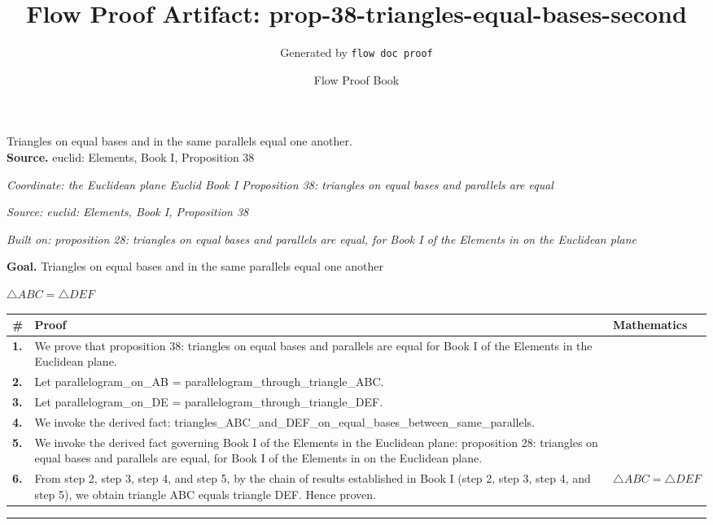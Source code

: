 \documentclass[11pt]{article}
\title{Flow Proof Artifact: prop-38-triangles-equal-bases-second}
\author{Generated by \texttt{flow doc proof}}
\date{Flow Proof Book}
\theoremstyle{definition}
\begin{document}
\maketitle
Triangles on equal bases and in the same parallels equal one another.\\[0.5em]
\textbf{Source.} euclid: Elements, Book I, Proposition 38\\[0.5em]
\bigskip
{}\par
\smallskip\noindent\textit{Coordinate: the Euclidean plane \cdot Euclid Book I \cdot Proposition 38: triangles on equal bases and parallels are equal}\par
\smallskip\noindent\textit{Source: euclid: Elements, Book I, Proposition 38}\par
\smallskip\noindent\textit{Built on: proposition 28: triangles on equal bases and parallels are equal, for Book I of the Elements in on the Euclidean plane}\par
\medskip
\noindent\textbf{Goal.} Triangles on equal bases and in the same parallels equal one another\par
\noindent$\displaystyle \triangle ABC = \triangle DEF$\par
\medskip
\noindent
\begin{tabular}{@{} >{\raggedright\arraybackslash}p{} >{\raggedright\arraybackslash}p{} >{\raggedleft\arraybackslash}p{} @{}}
\textbf{\#} & \textbf{Proof} & \textbf{Mathematics} \\
\midrule
\textbf{1.} & We prove that proposition 38: triangles on equal bases and parallels are equal for Book I of the Elements in the Euclidean plane. & \\[0.45em]
\textbf{2.} & Let parallelogram\_on\_AB = parallelogram\_through\_triangle\_ABC. & \\[0.45em]
\textbf{3.} & Let parallelogram\_on\_DE = parallelogram\_through\_triangle\_DEF. & \\[0.45em]
\textbf{4.} & We invoke the derived fact: triangles\_ABC\_and\_DEF\_on\_equal\_bases\_between\_same\_parallels. & \\[0.45em]
\textbf{5.} & We invoke the derived fact governing Book I of the Elements in the Euclidean plane: proposition 28: triangles on equal bases and parallels are equal, for Book I of the Elements in on the Euclidean plane. & \\[0.45em]
\textbf{6.} & From step 2, step 3, step 4, and step 5, by the chain of results established in Book I (step 2, step 3, step 4, and step 5), we obtain triangle ABC equals triangle DEF. Hence proven. & $\displaystyle \triangle ABC = \triangle DEF$ \\[0.45em]
\bottomrule
\end{tabular}
\label{thm:Geometry-Euclid Book I-proposition_38_triangles_on_equal_bases_and_parallels_are_equal}
\par\medskip\hrule
\end{document}
